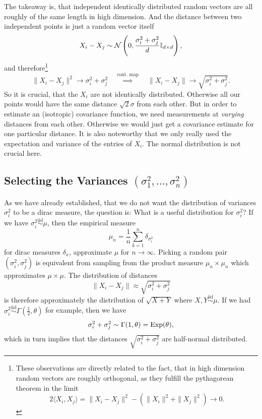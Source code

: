 The takeaway is, that independent identically distributed random vectors are
all roughly of the same length in high dimension. And the distance between
two independent points is just a random vector itself
\[
	X_i-X_j\sim\mathcal{N}\left(
		0,\frac{\sigma_i^2+\sigma_j^2}{d}\mathbb{I}_{d\times d}
	\right),
\]
and therefore\footnote{
	These observations are directly related to the fact, that in high dimension
	random vectors are roughly orthogonal, as they fulfill the pythagorean
	theorem in the limit
	\[
		2\langle X_i, X_j\rangle = \|X_i-X_j\|^2 - (\|X_i\|^2 + \|X_j\|^2) \to 0.
	\]
}
\[
	\|X_i- X_j\|^2 \to \sigma_i^2 + \sigma_j^2
	\quad\overset{\text{cont. map}}\implies \quad
	\|X_i-X_j\|\to\sqrt{\sigma_i^2+\sigma_j^2}.
\]
So it is crucial, that the \(X_i\) are not identically distributed. Otherwise
all our points would have the same distance \(\sqrt{2}\sigma\) from each other. But
in order to estimate an (isotropic) covariance function,
we need measurements at \emph{varying} distances from each other. Otherwise we would
just get a covariance estimate for one particular distance. It is also noteworthy
that we only really used the expectation and variance of the entries of \(X_i\).
The normal distribution is not crucial here.

\subsection{Selecting the Variances \texorpdfstring{\((\sigma_1^2,\dots,\sigma_n^2)\)}{(σ₁²,...,σₙ²)}}

As we have already established, that we do not want the distribution of
variances \(\sigma_i^2\) to be a dirac measure, the question is: What is a
useful distribution for \(\sigma_i^2\)? If we have
\(\sigma_i^2\overset{\text{iid}}\sim\mu\), then the empirical measure
\[
	\mu_n = \frac1n\sum_{k=1}^n \delta_{\sigma_i^2}
\]
for dirac measures \(\delta_x\), approximate \(\mu\) for \(n\to\infty\). Picking
a random pair \((\sigma_i^2,\sigma_j^2)\) is equivalent from sampling from the
product measure \(\mu_n \times \mu_n\) which approximates \(\mu\times\mu\).
The distribution of distances
\[
	\|X_i-X_j\| \approx \sqrt{\sigma_i^2 + \sigma_j^2}
\]
is therefore approximately the distribution of \(\sqrt{X+Y}\) where
\(X,Y\overset{\text{iid}}\sim\mu\). If we had
\(\sigma_i^2\overset{\text{iid}}{\sim}\Gamma(\tfrac12,\theta)\) for example,
then we have
\[
	\sigma_i^2 + \sigma_j^2 \sim \Gamma(1,\theta) = \operatorname{Exp}(\theta),
\]
which in turn implies that the distances \(\sqrt{\sigma_i^2 + \sigma_j^2}\)
are half-normal distributed.

